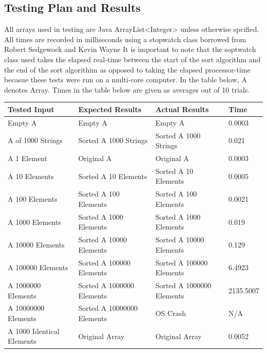 \documentclass[onecolumn, 12pt, article]{IEEEtran}
\numberwithin{case}{problem}
\numberwithin{condition}{problem}
\numberwithin{condition}{subsection}
\numberwithin{definition}{section}
\theoremstyle{remark}
\numberwithin{question}{problem}
\theoremstyle{plain}
\numberwithin{answer}{problem}
\numberwithin{solution}{section}
\numberwithin{equation}{section}%
\begin{document}
\subsection{Testing Plan and Results}
All arrays used in testing are Java ArrayList<Integer> unless otherwise spcified. All times are recorded in milliseconds using a stopwatch class borrowed from Robert Sedgewock and Kevin Wayne \cite{stopwatch}
It is important to note that the soptwatch class used takes the elapsed real-time between the start of the sort algorithm and the end of the sort algorithim as opposed to taking the elapsed processor-time becasue these tests were run on a multi-core computer.
In the table below, A denotes Array. Times in the table below are given as averages out of 10 trials.
\newline
{}
\begin{center}
\begin{tabular}{|l|l|l|l|}
\hline Tested Input & Expected Results & Actual Results & Time \\
\hline Empty A & Empty A & Empty A & 0.0003 \\
\hline A of 1000 Strings & Sorted A 1000 Strings & Sorted A 1000 Strings & 0.021 \\
\hline A 1 Element & Original A & Original A & 0.0003 \\
\hline A 10 Elements & Sorted A 10 Elements & Sorted A 10 Elements & 0.0005 \\
\hline A 100 Elements & Sorted A 100 Elements & Sorted A 100 Elements & 0.0021 \\
\hline A 1000 Elements & Sorted A 1000 Elements & Sorted A 1000 Elements & 0.019 \\
\hline A 10000 Elements & Sorted A 10000 Elements & Sorted A 10000 Elements & 0.129 \\
\hline A 100000 Elements & Sorted A 100000 Elements & Sorted A 100000 Elements & 6.4923 \\
\hline A 1000000 Elements & Sorted A 1000000 Elements & Sorted A 1000000 Elements & 2135.5007 \\
\hline A 10000000 Elements & Sorted A 10000000 Elements & OS Crash & N/A \\
\hline A 1000 Identical Elements & Original Array & Original Array & 0.0052 \\
\hline
\end{tabular}
\end{center}
\end{document}
